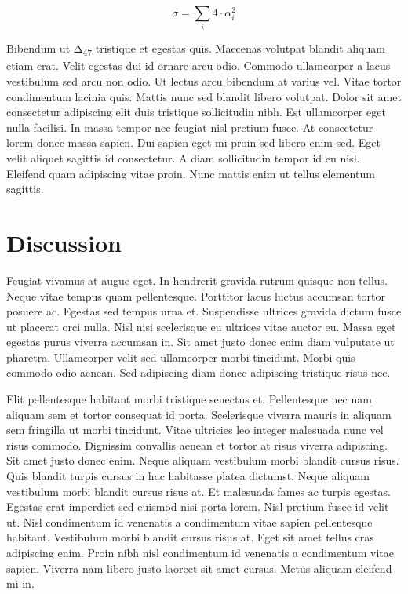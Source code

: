 \begin{equation}
\sigma = \sum_i4\cdot α^2_i
\label{eq:foo}
\end{equation}

Bibendum ut Δ\textsubscript{47} tristique et egestas quis. Maecenas
volutpat blandit aliquam etiam erat. Velit egestas dui id ornare arcu
odio. Commodo ullamcorper a lacus vestibulum sed arcu non odio. Ut
lectus arcu bibendum at varius vel. Vitae tortor condimentum lacinia
quis. Mattis nunc sed blandit libero volutpat. Dolor sit amet
consectetur adipiscing elit duis tristique sollicitudin nibh. Est
ullamcorper eget nulla facilisi. In massa tempor nec feugiat nisl
pretium fusce. At consectetur lorem donec massa sapien. Dui sapien eget
mi proin sed libero enim sed. Eget velit aliquet sagittis id
consectetur. A diam sollicitudin tempor id eu nisl. Eleifend quam
adipiscing vitae proin. Nunc mattis enim ut tellus elementum sagittis.

\hypertarget{discussion}{%
\section{Discussion}\label{discussion}}

Feugiat vivamus at augue eget. In hendrerit gravida rutrum quisque non
tellus. Neque vitae tempus quam pellentesque. Porttitor lacus luctus
accumsan tortor posuere ac. Egestas sed tempus urna et. Suspendisse
ultrices gravida dictum fusce ut placerat orci nulla. Nisl nisi
scelerisque eu ultrices vitae auctor eu. Massa eget egestas purus
viverra accumsan in. Sit amet justo donec enim diam vulputate ut
pharetra. Ullamcorper velit sed ullamcorper morbi tincidunt. Morbi quis
commodo odio aenean. Sed adipiscing diam donec adipiscing tristique
risus nec.

Elit pellentesque habitant morbi tristique senectus et. Pellentesque nec
nam aliquam sem et tortor consequat id porta. Scelerisque viverra mauris
in aliquam sem fringilla ut morbi tincidunt. Vitae ultricies leo integer
malesuada nunc vel risus commodo. Dignissim convallis aenean et tortor
at risus viverra adipiscing. Sit amet justo donec enim. Neque aliquam
vestibulum morbi blandit cursus risus. Quis blandit turpis cursus in hac
habitasse platea dictumst. Neque aliquam vestibulum morbi blandit cursus
risus at. Et malesuada fames ac turpis egestas. Egestas erat imperdiet
sed euismod nisi porta lorem. Nisl pretium fusce id velit ut. Nisl
condimentum id venenatis a condimentum vitae sapien pellentesque
habitant. Vestibulum morbi blandit cursus risus at. Eget sit amet tellus
cras adipiscing enim. Proin nibh nisl condimentum id venenatis a
condimentum vitae sapien. Viverra nam libero justo laoreet sit amet
cursus. Metus aliquam eleifend mi in.

